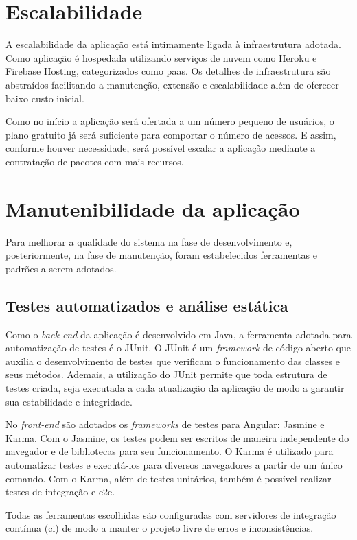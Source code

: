 \section{Escalabilidade}
A escalabilidade da aplicação está intimamente ligada à infraestrutura adotada. Como aplicação é hospedada utilizando serviços de nuvem como Heroku e Firebase Hosting, categorizados como \ac{paas}. Os detalhes de infraestrutura são abstraídos facilitando a manutenção, extensão e escalabilidade além de oferecer baixo custo inicial. 

Como no início a aplicação será ofertada a um número pequeno de usuários, o plano gratuito já será suficiente para comportar o número de acessos. E assim, conforme houver necessidade, será possível escalar a aplicação mediante a contratação de pacotes com mais recursos.

\section{Manutenibilidade da aplicação}
Para melhorar a qualidade do sistema na fase de desenvolvimento e, posteriormente, na fase de manutenção, foram estabelecidos ferramentas e padrões a serem adotados.

\subsection{Testes automatizados e análise estática}


Como o \textit{\gls{back-end}} da aplicação é desenvolvido em Java, a ferramenta adotada para automatização de testes é o JUnit. O JUnit é um \textit{\gls{framework}} de código aberto que auxilia o desenvolvimento de testes que verificam o funcionamento das classes e seus métodos. Ademais, a utilização do JUnit permite que toda estrutura de testes criada, seja executada a cada atualização da aplicação  de modo a garantir sua estabilidade e integridade.


No \textit{\gls{front-end}} são adotados os \textit{\glspl{framework}} de testes para Angular: Jasmine e Karma. Com o Jasmine, os testes podem ser escritos de maneira independente do navegador e de bibliotecas para seu funcionamento. O Karma é utilizado para automatizar testes e executá-los para diversos navegadores a partir de um único comando. Com o Karma, além de testes unitários, também é possível realizar testes de integração e \ac{e2e}.


Todas as ferramentas escolhidas são configuradas com servidores de integração contínua (\ac{ci}) de modo a manter o projeto livre de erros e inconsistências.


